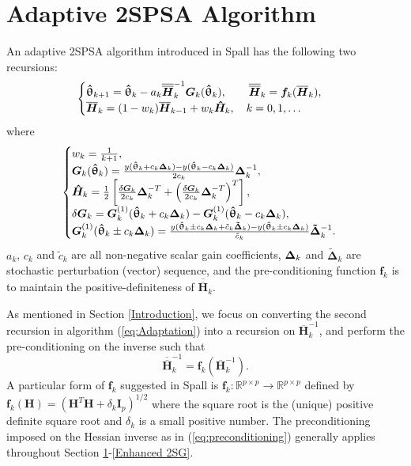 \documentclass[conference]{IEEEtran} \ifCLASSINFOpdf
\newcommand{\oH}{\bm{\overline{H}}}
\newcommand{\ooH}{\bm{\overline{\overline{H}}}}
\newcommand{\hH}{\bm{\hat{H}}} \newcommand{\hPsi}{\bm{\hat{\Psi}}}
\newcommand{\htheta}{\bm{\hat{\uptheta}}}
\newcommand{\tDelta}{\bm{\tilde{\Delta}}}
\begin{document}
\section{Adaptive 2SPSA Algorithm} \label{2SPSA} An adaptive
2SPSA algorithm introduced in Spall \cite{Spall2000} has the following
two recursions:
\begin{equation} \label{eq:Adaptation}
  \begin{cases}
    \htheta_{k+1}=\htheta_k-a_k\ooH_k^{-1} \bG_k(\htheta_k),
  \qquad \bm{\ooH}_k=\bm{f}_k(\oH_k),\\ \oH_k= (1 - w_k) \oH_{k-1}+ w_k \hH_k,
 \quad k=0,1,\dots
  \end{cases}
\end{equation}
where
\begin{equation} \label{eq:notations}
  \begin{cases} w_k=\frac{1}{k+1},\\
    \bG_k(\htheta_k)=\frac{y(\htheta_k+c_k\bDelta_k)-y(\htheta_k-c_k\bDelta_k)}{2c_k}\bDelta_k^{-1},\\
    \hH_k=\frac{1}{2}\left[
      \frac{\delta\bG_k}{2c_k}\bDelta_k^{-T}+\left(\frac{\delta\bG_k}{2c_k}\bDelta_k^{-T}\right)^T \right],\\
    \delta\bG_k=\bG_k^{(1)}(\htheta_k+ c_k\bDelta_k)-\bG_k^{(1)}(\htheta_k- c_k\bDelta_k),\\
    \bG_k^{(1)}(\htheta_k\pm c_k\bDelta_k) =\frac{y(\htheta_k\pm c_k\bDelta_k+\tilde{c}_k\tDelta_k)-y(\htheta_k\pm c_k\bDelta_k)}{\tilde{c}_k}\tDelta_k^{-1}.\\
  \end{cases}
\end{equation} $ a_k $, $ c_k $ and $ \tilde{c}_k $ are all
non-negative scalar gain coefficients, $ \bm{\Delta}_k $ and $ \tDelta_k $
are stochastic perturbation (vector) sequence, and the
pre-conditioning function $ \bm{f}_k $ is to maintain the
positive-definiteness of $ \ooH_k $.

As mentioned in Section \ref{Introduction}, we focus on
converting the second recursion in algorithm (\ref{eq:Adaptation})
into a recursion on $\oH_k^{-1}$, and perform the pre-conditioning on
the inverse such that
\begin{equation} \label{eq:preconditioning}
  \bm{\ooH}_k^{-1}=\bm{f}_k(\oH_k^{-1}).
\end{equation} A particular form of $\bm{f}_k$ suggested in
Spall \cite{Spall2009} is $\bm{f}_k: \mathbb{R}^{p\times p} \to \mathbb{R}^{p\times p}$ defined by
$\bm{f}_k(\bm{H})=(\bm{H}^{T}\bm{H}+\delta_k \bm{I}_p)^{1/2}$ where
the square root is the (unique) positive definite square root and
$\delta_k$ is a small positive number. The preconditioning imposed on
the Hessian inverse as in (\ref{eq:preconditioning}) generally applies
throughout Section \ref{2SPSA}-\ref{Enhanced 2SG}.
\end{document}
